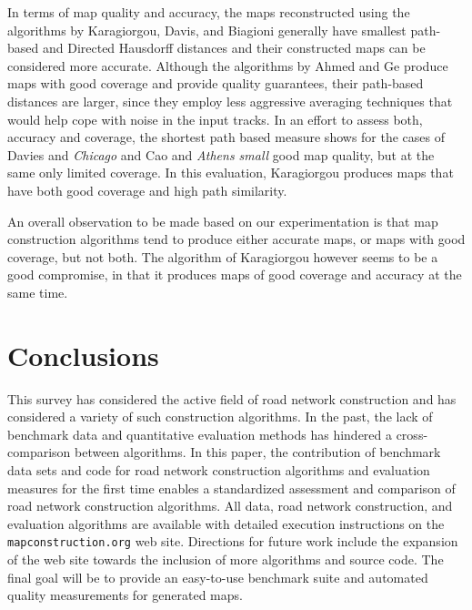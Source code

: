 \documentclass[natbib]{svjour3}                    \smartqed  \usepackage[table]{xcolor}
\begin{document}
In terms of map quality and accuracy, the maps reconstructed using the algorithms by Karagiorgou, Davis, and  Biagioni generally have smallest path-based and Directed Hausdorff distances and their constructed maps can be considered more accurate. 
Although the algorithms by Ahmed and Ge produce maps with good coverage and provide quality guarantees, their path-based distances are larger, since they employ less aggressive averaging techniques that would help cope with noise in the input tracks.
In an effort to assess both, accuracy and coverage, the shortest path based measure shows for the cases of Davies and \emph{Chicago} and Cao and \emph{Athens small} good map quality, but at the same only limited coverage. In this evaluation, Karagiorgou produces maps that have both good coverage and high path similarity.

An overall observation to be made based on our experimentation is that map construction algorithms tend to produce either accurate maps, or maps with good coverage, but not both. The algorithm of Karagiorgou however seems to be a good compromise, in that it produces maps of good coverage and accuracy at the same time.



\section{Conclusions}
\label{sec:conclusions}
This survey has considered the active field of road network construction and has considered a variety of such construction algorithms.
In the past, the lack of benchmark data and quantitative evaluation methods has hindered a cross-comparison between algorithms. 
In this paper, the contribution of benchmark data sets and code for road network construction algorithms and evaluation measures for the first time enables a standardized assessment and comparison of road network construction algorithms. All data, road network construction, and evaluation algorithms are available with detailed execution instructions on the {\tt mapconstruction.org} web site. Directions for future work include the expansion of the web site towards the inclusion of more algorithms and source code. The final goal will be to provide an easy-to-use benchmark suite and automated quality measurements for generated maps.
 
\end{document}
